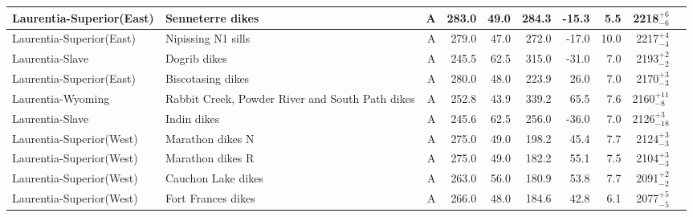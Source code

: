 \begin{longtable}{p{1 in}p{1 in}rrrrrrrp{1.5 in}}
      Laurentia-Superior(East) &                                 Senneterre dikes &      A &     283.0 &      49.0 & 284.3 & -15.3 &       5.5 &     2218$^{+6}_{-6}$ &                                 \cite{Buchan1993a} \\ \hline
      Laurentia-Superior(East) &                               Nipissing N1 sills &      A &     279.0 &      47.0 & 272.0 & -17.0 &      10.0 &     2217$^{+4}_{-4}$ &                                 \cite{Buchan2000a} \\ \hline
               Laurentia-Slave &                                     Dogrib dikes &      A &     245.5 &      62.5 & 315.0 & -31.0 &       7.0 &     2193$^{+2}_{-2}$ &                               \cite{Mitchell2014a} \\ \hline
      Laurentia-Superior(East) &                                Biscotasing dikes &      A &     280.0 &      48.0 & 223.9 &  26.0 &       7.0 &     2170$^{+3}_{-3}$ &                                  \cite{Evans2010a} \\ \hline
             Laurentia-Wyoming &  Rabbit Creek, Powder River and South Path dikes &      A &     252.8 &      43.9 & 339.2 &  65.5 &       7.6 &    2160$^{+11}_{-8}$ &                                 \cite{Kilian2015a} \\ \hline
               Laurentia-Slave &                                      Indin dikes &      A &     245.6 &      62.5 & 256.0 & -36.0 &       7.0 &    2126$^{+3}_{-18}$ &                                 \cite{Buchan2016a} \\ \hline
      Laurentia-Superior(West) &                                 Marathon dikes N &      A &     275.0 &      49.0 & 198.2 &  45.4 &       7.7 &     2124$^{+3}_{-3}$ &                                  \cite{Halls2008a} \\ \hline
      Laurentia-Superior(West) &                                 Marathon dikes R &      A &     275.0 &      49.0 & 182.2 &  55.1 &       7.5 &     2104$^{+3}_{-3}$ &                                  \cite{Halls2008a} \\ \hline
      Laurentia-Superior(West) &                               Cauchon Lake dikes &      A &     263.0 &      56.0 & 180.9 &  53.8 &       7.7 &     2091$^{+2}_{-2}$ &                                  \cite{Evans2010a} \\ \hline
      Laurentia-Superior(West) &                               Fort Frances dikes &      A &     266.0 &      48.0 & 184.6 &  42.8 &       6.1 &     2077$^{+5}_{-5}$ &                                  \cite{Evans2010a} \\ \hline

\end{longtable}
